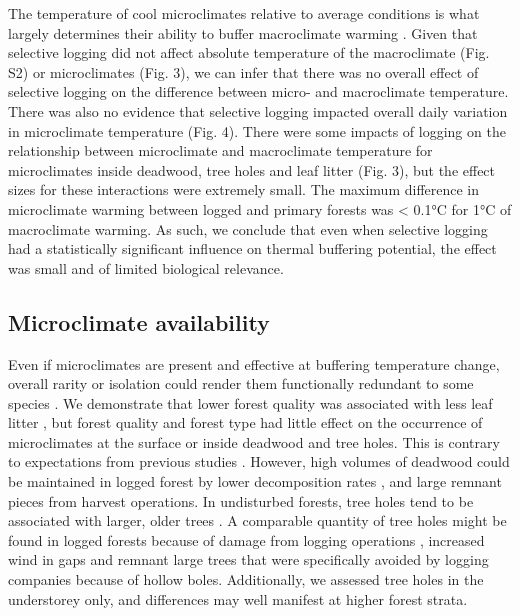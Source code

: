 \documentclass[12pt,a4paper,]{report}
\theoremstyle{definition}
\theoremstyle{definition}
\theoremstyle{definition}
\theoremstyle{remark}
\begin{document}
The temperature of cool microclimates relative to average conditions is
what largely determines their ability to buffer macroclimate warming
\citep{scheffers_microhabitats2014-1, gonzalez_del_pliego_thermally2016, shi_framework2016}.
Given that selective logging did not affect absolute temperature of the
macroclimate (Fig. S2) or microclimates (Fig. 3), we can infer that
there was no overall effect of selective logging on the difference
between micro- and macroclimate temperature. There was also no evidence
that selective logging impacted overall daily variation in microclimate
temperature (Fig. 4). There were some impacts of logging on the
relationship between microclimate and macroclimate temperature for
microclimates inside deadwood, tree holes and leaf litter (Fig. 3), but
the effect sizes for these interactions were extremely small. The
maximum difference in microclimate warming between logged and primary
forests was \textless{} 0.1°C for 1°C of macroclimate warming. As such,
we conclude that even when selective logging had a statistically
significant influence on thermal buffering potential, the effect was
small and of limited biological relevance.

\subsection{Microclimate
availability}\label{microclimate-availability-1}

Even if microclimates are present and effective at buffering temperature
change, overall rarity or isolation could render them functionally
redundant to some species
\citep{sears_world2011, sears_configuration2016}. We demonstrate that
lower forest quality was associated with less leaf litter \citep[Fig. 5;
cf.][]{saner_reduced2009}, but forest quality and forest type had little
effect on the occurrence of microclimates at the surface or inside
deadwood and tree holes. This is contrary to expectations from previous
studies \citep{ball_tree1999, blakely_tree2008}. However, high volumes
of deadwood could be maintained in logged forest by lower decomposition
rates
\citetext{\citealp{ewers_logging2015}; \citealp{yeong_leaf2016}; \citealp[but
see][]{herault_modeling2010}}, and large remnant pieces from harvest
operations. In undisturbed forests, tree holes tend to be associated
with larger, older trees
\citep{lindenmayer_cavity2000, blakely_tree2008}. A comparable quantity
of tree holes might be found in logged forests because of damage from
logging operations \citep{edwards_maintaining2014}, increased wind in
gaps \citep{chen_growing-season1995} and remnant large trees that were
specifically avoided by logging companies because of hollow boles.
Additionally, we assessed tree holes in the understorey only, and
differences may well manifest at higher forest strata.
\end{document}
